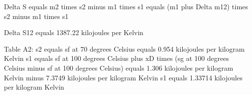 Delta S equals m2 times s2 minus m1 times s1  
equals (m1 plus Delta m12) times s2 minus m1 times s1  

Delta S12 equals 1387.22 kilojoules per Kelvin  

Table A2:  
s2 equals sf at 70 degrees Celsius equals 0.954 kilojoules per kilogram Kelvin  
s1 equals sf at 100 degrees Celsius plus xD times (sg at 100 degrees Celsius minus sf at 100 degrees Celsius)  
equals 1.306 kilojoules per kilogram Kelvin minus 7.3749 kilojoules per kilogram Kelvin  
s1 equals 1.33714 kilojoules per kilogram Kelvin